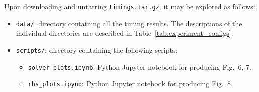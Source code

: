 \documentclass[gmd,manuscript]{copernicus}
\begin{document}
Upon downloading and untarring \texttt{timings.tar.gz}, it may be explored as follows:

\begin{itemize}
   \item \texttt{data/}: directory containing all the timing results. The descriptions of the individual directories are described in Table~\ref{tab:experiment_configs}.
\item \texttt{scripts/}: directory containing the following scripts:
\begin{itemize}
   \item \texttt{solver\_plots.ipynb}: Python Jupyter notebook for producing Fig.~6, 7.
   \item \texttt{rhs\_plots.ipynb}: Python Jupyter notebook for producing Fig.~8.
\end{itemize}
\end{itemize}
\end{document}
